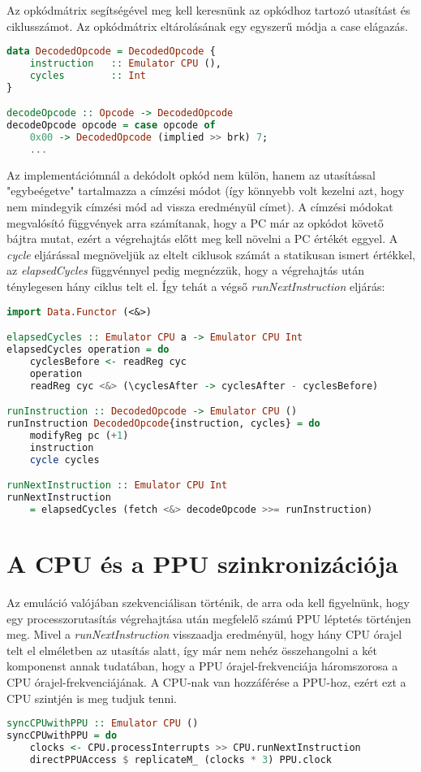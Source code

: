 Az opkódmátrix segítségével meg kell keresnünk az opkódhoz tartozó utasítást és ciklusszámot. Az opkódmátrix eltárolásának egy egyszerű módja a case elágazás.

\begin{lstlisting}[language=Haskell]
data DecodedOpcode = DecodedOpcode {
	instruction   :: Emulator CPU (),
	cycles        :: Int
}

decodeOpcode :: Opcode -> DecodedOpcode
decodeOpcode opcode = case opcode of
	0x00 -> DecodedOpcode (implied >> brk) 7;
	...
\end{lstlisting}
\vspace{0.3cm}
Az implementációmnál a dekódolt opkód nem külön, hanem az utasítással "egybeégetve" tartalmazza a címzési módot (így könnyebb volt kezelni azt, hogy nem mindegyik címzési mód ad vissza eredményül címet). A címzési módokat megvalósító függvények arra számítanak, hogy a PC már az opkódot követő bájtra mutat, ezért a végrehajtás előtt meg kell növelni a PC értékét eggyel.
A \emph{cycle} eljárással megnöveljük az eltelt ciklusok számát a statikusan ismert értékkel, az \emph{elapsedCycles} függvénnyel pedig megnézzük, hogy a végrehajtás után ténylegesen hány ciklus telt el.
Így tehát a végső \emph{runNextInstruction} eljárás:
\vspace{0.3cm}
\begin{lstlisting}[language=Haskell]
import Data.Functor (<&>)

elapsedCycles :: Emulator CPU a -> Emulator CPU Int
elapsedCycles operation = do
	cyclesBefore <- readReg cyc
	operation
	readReg cyc <&> (\cyclesAfter -> cyclesAfter - cyclesBefore)

runInstruction :: DecodedOpcode -> Emulator CPU ()
runInstruction DecodedOpcode{instruction, cycles} = do
	modifyReg pc (+1)
	instruction
	cycle cycles

runNextInstruction :: Emulator CPU Int
runNextInstruction 
 	= elapsedCycles (fetch <&> decodeOpcode >>= runInstruction)
\end{lstlisting}

\section{A CPU és a PPU szinkronizációja}
Az emuláció valójában szekvenciálisan történik, de arra oda kell figyelnünk, hogy egy processzorutasítás végrehajtása után megfelelő számú PPU léptetés történjen meg. Mivel a \emph{runNextInstruction} visszaadja eredményül, hogy hány CPU órajel telt el elméletben az utasítás alatt, így már nem nehéz összehangolni a két komponenst annak tudatában, hogy a PPU órajel-frekvenciája háromszorosa a CPU órajel-frekvenciájának.
A CPU-nak van hozzáférése a PPU-hoz, ezért ezt a CPU szintjén is meg tudjuk tenni.
\begin{lstlisting}[language=Haskell]
syncCPUwithPPU :: Emulator CPU ()
syncCPUwithPPU = do
	clocks <- CPU.processInterrupts >> CPU.runNextInstruction
	directPPUAccess $ replicateM_ (clocks * 3) PPU.clock
\end{lstlisting}

